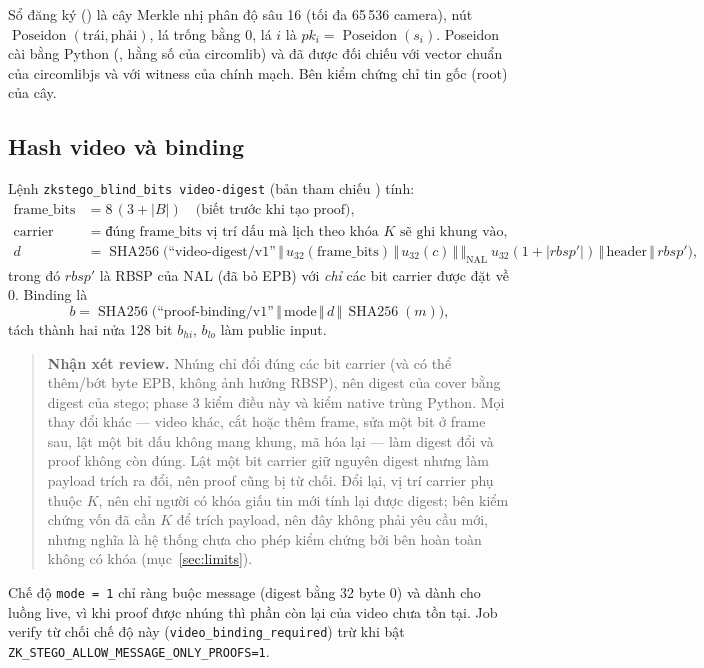\documentclass[10pt,a4paper]{article}
\newcommand{\review}[1]{\begin{quote}\colorbox{ReviewBg}{\parbox{0.94\linewidth}{\textbf{Nhận xét review.} #1}}\end{quote}}
\begin{document}
Sổ đăng ký () là cây Merkle nhị phân độ sâu 16 (tối đa 65\,536 camera), nút $\operatorname{Poseidon}(\text{trái},\text{phải})$, lá trống bằng 0, lá $i$ là $pk_i=\operatorname{Poseidon}(s_i)$. Poseidon cài bằng Python (, hằng số của circomlib) và đã được đối chiếu với vector chuẩn của circomlibjs và với witness của chính mạch. Bên kiểm chứng chỉ tin gốc (root) của cây.

\subsection{Hash video và binding}

Lệnh \texttt{zkstego\_blind\_bits video-digest} (bản tham chiếu ) tính:
\[
\begin{aligned}
\text{frame\_bits} &= 8\,(3+|B|)\quad\text{(biết trước khi tạo proof)},\\
\text{carrier} &= \text{đúng frame\_bits vị trí dấu mà lịch theo khóa } K \text{ sẽ ghi khung vào},\\
d &= \operatorname{SHA256}\bigl(\text{``video-digest/v1''}\,\Vert\,u_{32}(\text{frame\_bits})\,\Vert\,u_{32}(c)\,\Vert\,\textstyle\Vert_{\text{NAL}}\ u_{32}(1+|rbsp'|)\,\Vert\,\text{header}\,\Vert\,rbsp'\bigr),
\end{aligned}
\]
trong đó $rbsp'$ là RBSP của NAL (đã bỏ EPB) với \emph{chỉ} các bit carrier được đặt về 0. Binding là
\[
  b=\operatorname{SHA256}\bigl(\text{``proof-binding/v1''}\,\Vert\,\text{mode}\,\Vert\,d\,\Vert\,\operatorname{SHA256}(m)\bigr),
\]
tách thành hai nửa 128 bit $b_{hi}$, $b_{lo}$ làm public input.

\review{Nhúng chỉ đổi đúng các bit carrier (và có thể thêm/bớt byte EPB, không ảnh hưởng RBSP), nên digest của cover bằng digest của stego; phase 3 kiểm điều này và kiểm native trùng Python. Mọi thay đổi khác --- video khác, cắt hoặc thêm frame, sửa một bit ở frame sau, lật một bit dấu không mang khung, mã hóa lại --- làm digest đổi và proof không còn đúng. Lật một bit carrier giữ nguyên digest nhưng làm payload trích ra đổi, nên proof cũng bị từ chối. Đổi lại, vị trí carrier phụ thuộc $K$, nên chỉ người có khóa giấu tin mới tính lại được digest; bên kiểm chứng vốn đã cần $K$ để trích payload, nên đây không phải yêu cầu mới, nhưng nghĩa là hệ thống chưa cho phép kiểm chứng bởi bên hoàn toàn không có khóa (mục~\ref{sec:limits}).}

Chế độ \texttt{mode = 1} chỉ ràng buộc message (digest bằng 32 byte 0) và dành cho luồng live, vì khi proof được nhúng thì phần còn lại của video chưa tồn tại. Job verify từ chối chế độ này (\texttt{video\_binding\_required}) trừ khi bật \texttt{ZK\_STEGO\_ALLOW\_MESSAGE\_ONLY\_PROOFS=1}.
\end{document}
